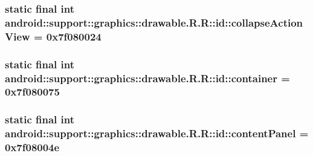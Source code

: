 \hypertarget{classandroid_1_1support_1_1graphics_1_1drawable_1_1_r_1_1id_9d69cd26d661f19538224ddd8096d482}{
\subsubsection[{collapseActionView}]{\setlength{\rightskip}{0pt plus 5cm}static final int android::support::graphics::drawable.R.R::id::collapseActionView = 0x7f080024}}
\label{classandroid_1_1support_1_1graphics_1_1drawable_1_1_r_1_1id_9d69cd26d661f19538224ddd8096d482}


\hypertarget{classandroid_1_1support_1_1graphics_1_1drawable_1_1_r_1_1id_233e9b8e317378915a13b37122cf8fea}{
\subsubsection[{container}]{\setlength{\rightskip}{0pt plus 5cm}static final int android::support::graphics::drawable.R.R::id::container = 0x7f080075}}
\label{classandroid_1_1support_1_1graphics_1_1drawable_1_1_r_1_1id_233e9b8e317378915a13b37122cf8fea}


\hypertarget{classandroid_1_1support_1_1graphics_1_1drawable_1_1_r_1_1id_0be0a8bf06a85836951ba36646fbe189}{
\subsubsection[{contentPanel}]{\setlength{\rightskip}{0pt plus 5cm}static final int android::support::graphics::drawable.R.R::id::contentPanel = 0x7f08004e}}
\label{classandroid_1_1support_1_1graphics_1_1drawable_1_1_r_1_1id_0be0a8bf06a85836951ba36646fbe189}


